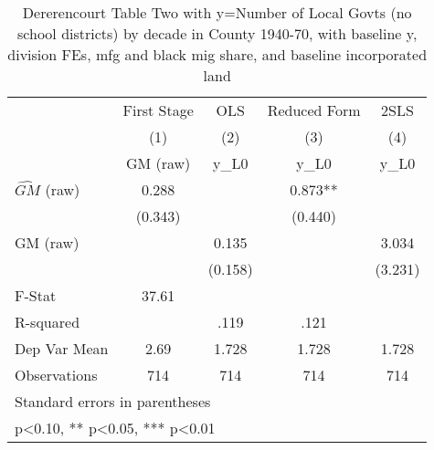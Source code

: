 \begin{table}[htbp]\centering
\def\sym#1{\ifmmode^{#1}\else\(^{#1}\)\fi}
\caption{Dererencourt Table Two with y=Number of Local Govts (no school districts) by decade in County 1940-70, with baseline y, division FEs, mfg and black mig share, and baseline incorporated land}
\begin{tabular}{l*{4}{c}}
\toprule
                    & First Stage   &         OLS   &Reduced Form   &        2SLS   \\
                    &\multicolumn{1}{c}{(1)}&\multicolumn{1}{c}{(2)}&\multicolumn{1}{c}{(3)}&\multicolumn{1}{c}{(4)}\\
                    &\multicolumn{1}{c}{GM  (raw)}&\multicolumn{1}{c}{y\_L0}&\multicolumn{1}{c}{y\_L0}&\multicolumn{1}{c}{y\_L0}\\
\midrule
$\hat{GM}$ (raw)    &       0.288   &               &       0.873** &               \\
                    &     (0.343)   &               &     (0.440)   &               \\
\addlinespace
GM  (raw)           &               &       0.135   &               &       3.034   \\
                    &               &     (0.158)   &               &     (3.231)   \\
\midrule
F-Stat              &       37.61   &               &               &               \\
R-squared           &               &        .119   &        .121   &               \\
Dep Var Mean        &        2.69   &       1.728   &       1.728   &       1.728   \\
Observations        &         714   &         714   &         714   &         714   \\
\bottomrule
\multicolumn{5}{l}{\footnotesize Standard errors in parentheses}\\
\multicolumn{5}{l}{\footnotesize * p<0.10, ** p<0.05, *** p<0.01}\\
\end{tabular}
\end{table}
